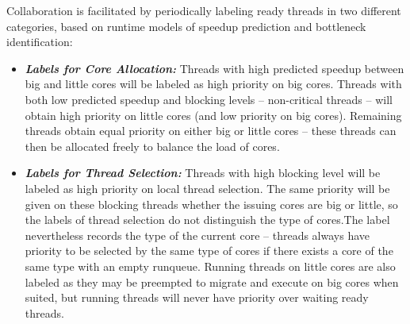\documentclass{sig-alternate}
\begin{document}
Collaboration is facilitated by periodically labeling ready threads in two different categories, based on runtime models of speedup prediction and bottleneck identification: 
\begin{itemize}
\item \textbf{\textit{Labels for Core Allocation:}} Threads with high predicted speedup between big and little cores will be labeled as high priority on big cores. Threads with both low predicted speedup and blocking levels -- non-critical threads -- will obtain high priority on little cores (and low priority on big cores). Remaining threads obtain equal priority on either big or little cores -- these threads can then be allocated freely to balance the load of cores.
\item \textbf{\textit{Labels for Thread Selection:}} 
Threads with high blocking level will be labeled as high priority on local thread selection. The same priority will be given on these blocking threads whether the issuing cores are big or little, so the labels of thread selection do not distinguish the type of cores.The label nevertheless records the type of the current core -- threads always have priority to be selected by the same type of cores if there exists a core of the same type with an empty runqueue. Running threads on little cores are also labeled as they may be preempted to migrate and execute on big cores when suited, but running threads will never have priority over waiting ready threads. 
\end{itemize}


\end{document}
